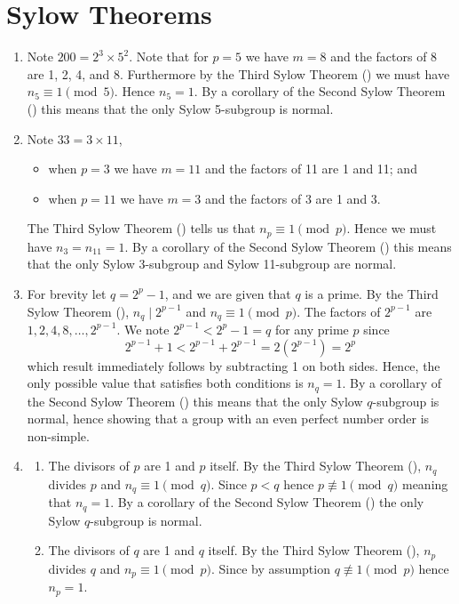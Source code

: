 \section{Sylow Theorems}
\begin{enumerate}
    \item Note $200 = 2^3 \times 5^2$. Note that for $p = 5$ we have $m = 8$ and the factors of 8 are 1, 2, 4, and 8. Furthermore by the Third Sylow Theorem () we must have $n_5 \equiv 1 \pmod 5$. Hence $n_5 = 1$. By a corollary of the Second Sylow Theorem () this means that the only Sylow 5-subgroup is normal.

    \item Note $33 = 3 \times 11$,
    \begin{itemize}
        \item when $p = 3$ we have $m = 11$ and the factors of 11 are 1 and 11; and
        \item when $p = 11$ we have $m = 3$ and the factors of 3 are 1 and 3.
    \end{itemize}
    The Third Sylow Theorem () tells us that $n_p \equiv 1 \pmod p$. Hence we must have $n_3 = n_{11} = 1$. By a corollary of the Second Sylow Theorem () this means that the only Sylow 3-subgroup and Sylow 11-subgroup are normal.

    \item For brevity let $q = 2^p - 1$, and we are given that $q$ is a prime. By the Third Sylow Theorem (), $n_q \mid 2^{p-1}$ and $n_q \equiv 1 \pmod p$. The factors of $2^{p-1}$ are $1, 2, 4, 8, \dots, 2^{p-1}$. We note $2^{p-1} < 2^p - 1 = q$ for any prime $p$ since
    \[
        2^{p-1} + 1 < 2^{p-1} + 2^{p-1} = 2(2^{p-1}) = 2^p    
    \]
    which result immediately follows by subtracting 1 on both sides. Hence, the only possible value that satisfies both conditions is $n_q = 1$. By a corollary of the Second Sylow Theorem () this means that the only Sylow $q$-subgroup is normal, hence showing that a group with an even perfect number order is non-simple.

    \item \begin{enumerate}[label=(\roman*)]
        \item The divisors of $p$ are 1 and $p$ itself. By the Third Sylow Theorem (), $n_q$ divides $p$ and $n_q \equiv 1 \pmod q$. Since $p < q$ hence $p \not\equiv 1 \pmod q$ meaning that $n_q = 1$. By a corollary of the Second Sylow Theorem () the only Sylow $q$-subgroup is normal.
        \item The divisors of $q$ are 1 and $q$ itself. By the Third Sylow Theorem (), $n_p$ divides $q$ and $n_p \equiv 1 \pmod p$. Since by assumption $q \not\equiv 1 \pmod p$ hence $n_p = 1$.
        

\end{enumerate}
\end{enumerate}
